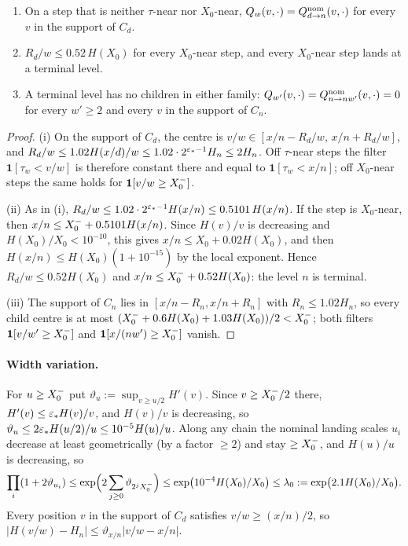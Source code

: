\begin{lemma}\label{lem:near-structure}
\begin{enumerate}[label=(\roman*)]
\item On a step that is neither $\tau$-near nor $X_0$-near, $Q_w(v,\cdot)=Q^{\mathrm{nom}}_{d\to n}(v,\cdot)$ for every $v$ in the
  support of $C_d$.
\item $R_d/w\le0.52\,H(X_0)$ for every $X_0$-near step, and every $X_0$-near step lands at a terminal level.
\item A terminal level has no children in either family: $Q_{w'}(v,\cdot)=Q^{\mathrm{nom}}_{n\to nw'}(v,\cdot)=0$ for every $w'\ge2$
  and every $v$ in the support of $C_n$.
\end{enumerate}
\end{lemma}

\begin{proof}
(i) On the support of $C_d$, the centre is $v/w\in[x/n-R_d/w,\,x/n+R_d/w]$, and
$R_d/w\le1.02H(x/d)/w\le1.02\cdot2^{\varepsilon_*-1}H_n\le2H_n$. Off $\tau$-near steps the filter $\mathbf 1[\tau_w<v/w]$ is therefore constant there and equal to
$\mathbf 1[\tau_w<x/n]$; off $X_0$-near steps the same holds for $\mathbf 1[v/w\ge X_0^{-}]$.

(ii) As in (i), $R_d/w\le1.02\cdot2^{\varepsilon_*-1}H(x/n)\le0.5101\,H(x/n)$. If the step is $X_0$-near, then
$x/n\le X_0^{-}+0.5101H(x/n)$. Since $H(v)/v$ is decreasing and $H(X_0)/X_0<10^{-10}$, this gives
$x/n\le X_0+0.02H(X_0)$, and then $H(x/n)\le H(X_0)(1+10^{-15})$ by the local exponent. Hence $R_d/w\le0.52H(X_0)$ and
$x/n\le X_0^{-}+0.52H(X_0)$: the level $n$ is terminal.

(iii) The support of $C_n$ lies in $[x/n-R_n,x/n+R_n]$ with $R_n\le1.02H_n$, so every child centre is at most
$(X_0^{-}+0.6H(X_0)+1.03H(X_0))/2<X_0^{-}$; both filters $\mathbf 1[v/w'\ge X_0^{-}]$ and $\mathbf 1[x/(nw')\ge X_0^{-}]$ vanish.
\end{proof}

\paragraph{Width variation.} For $u\ge X_0^{-}$ put $\vartheta_u:=\sup_{v\ge u/2}H'(v)$. Since $v\ge X_0^{-}/2$ there, $H'(v)\le\varepsilon_*H(v)/v$, and $H(v)/v$ is
decreasing, so $\vartheta_u\le2\varepsilon_*H(u/2)/u\le10^{-5}H(u)/u$. Along any chain the nominal landing scales $u_i$ decrease at least geometrically (by a
factor $\ge2$) and stay $\ge X_0^{-}$, and $H(u)/u$ is decreasing, so
\begin{equation}\label{eq:width-product}
  \prod_i(1+2\vartheta_{u_i})\le\exp\Bigl(2\sum_{j\ge0}\vartheta_{2^jX_0^{-}}\Bigr)\le\exp\bigl(10^{-4}H(X_0)/X_0\bigr)
  \le\lambda_0:=\exp\bigl(2.1H(X_0)/X_0\bigr).
\end{equation}
Every position $v$ in the support of $C_d$ satisfies $v/w\ge(x/n)/2$, so $|H(v/w)-H_n|\le\vartheta_{x/n}|v/w-x/n|$.

